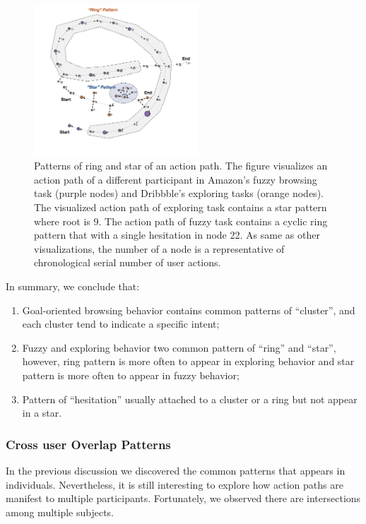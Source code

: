 \begin{figure}[H]
    \centering
    \includegraphics[width=0.55\textwidth]{figures/vis-patterns2}
    \caption{Patterns of ring and star of an action path. The figure visualizes an action path
    of a different participant in
    Amazon's fuzzy browsing task (purple nodes) and Dribbble's exploring tasks (orange nodes). 
    The visualized action path of exploring task contains a star pattern where root is 9.
    The action path of fuzzy task contains a cyclic ring pattern that with a single hesitation
    in node 22.
    As same as other visualizations, the number of a node
    is a representative of chronological serial number of user actions.}
    \label{fig:vis-fuzzy-explore2}
\end{figure}

In summary, we conclude that:

\begin{enumerate}
    \item Goal-oriented browsing behavior contains common patterns of ``cluster'', and each cluster tend to indicate a specific intent;
    \item Fuzzy and exploring behavior two common pattern of ``ring'' and ``star'', however, ring pattern is more often to appear 
          in exploring behavior and star pattern is more often to appear in fuzzy behavior;
    \item Pattern of ``hesitation'' usually attached to a cluster or a ring but not appear in a star.
\end{enumerate}

\subsubsection{Cross user Overlap Patterns}

In the previous discussion we discovered the common patterns that appears in individuals.
Nevertheless, it is still interesting to explore how action paths are manifest to multiple
participants. Fortunately, we observed there are intersections among multiple subjects.

